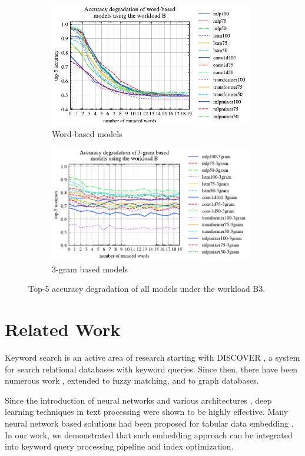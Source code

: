 \documentclass[conference]{IEEEtran}
\begin{document}
\begin{figure}[!th]
	\centering
	\begin{subfigure}[]{0.45\textwidth}
		\includegraphics[width=3.5in]{graphics/acc_degradation_word_based_B.pdf}
		\caption{Word-based models}
		\label{fig:acc_degradation_workload_B_word_based}
	\end{subfigure}
	\begin{subfigure}[]{0.45\textwidth}
		\includegraphics[width=3.5in]{graphics/acc_degradation_3gram_based_B.pdf}
		\caption{3-gram based models}
		\label{fig:acc_degradation_workload_B_3gram}
	\end{subfigure}
	\caption{Top-5 accuracy degradation of all models under the workload B3.}
	\label{fig:acc_degradation_workload_B_all}
\end{figure}

\section{Related Work}

Keyword search is an active area of research starting with DISCOVER \cite{hristidis2002discover}, a system for search relational databases with keyword queries.  Since then, there have been numerous work \cite{yu2022keyword}, extended to fuzzy matching, and to graph databases.

Since the introduction of neural networks and various architectures \cite{DBLP:journals/corr/VaswaniSPUJGKP17,DBLP:journals/corr/abs-2105-01601}, deep learning techniques in text processing \cite{kudo2018sentencepiece,gorishniy2021revisiting,tripathy2021comprehensive} were shown to be highly effective.  Many neural network based solutions had been proposed for tabular data embedding \cite{du2021tabularnet,huang2020tabtransformer,gorishniy2022embeddings,tabbie2021}.  In our work, we demonstrated that such embedding approach can be integrated into keyword query processing pipeline and index optimization.
\end{document}
